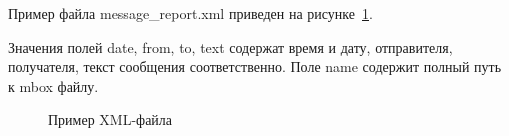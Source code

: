 Пример файла message\_report.xml приведен на рисунке~\ref{teresh_2:teresh_2}.


Значения полей date, from, to, text содержат время и дату, отправителя, получателя, текст сообщения соответственно. Поле name содержит полный путь к mbox файлу.

\begin{figure}[h!]
\caption{Пример XML-файла}
\label{teresh_2:teresh_2}
\end{figure}














